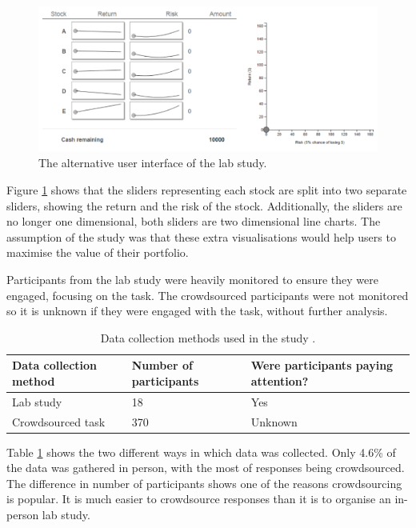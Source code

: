 \documentclass{article}
\begin{document}
\begin{figure}[ht]
    \centering
    \includegraphics[scale=0.45, frame]{Images/interfaceSA.png}
    \caption{The alternative user interface of the lab study.}
    \label{fig:interfaceSA}
\end{figure}

Figure \ref{fig:interfaceSA} shows that the sliders representing each stock are split into two separate sliders, showing the return and the risk of the stock.
Additionally, the sliders are no longer one dimensional, both sliders are two dimensional line charts.
The assumption of the study was that these extra visualisations would help users to maximise the value of their portfolio.

Participants from the lab study were heavily monitored to ensure they were engaged, focusing on the task.
The crowdsourced participants were not monitored so it is unknown if they were engaged with the task, without further analysis.

\begin{table}[ht]
    \caption{\label{table:studies} Data collection methods used in the study \cite{gruber2017thesis}.}
    \small
    \begin{tabular}{lll}
        \hline
        Data collection method & Number of participants & Were participants paying attention? \\    \hline
        Lab study              & 18                     & Yes                                 \\
        Crowdsourced task      & 370                    & Unknown                             \\    \hline
    \end{tabular}
\end{table}

Table \ref{table:studies} shows the two different ways in which data was collected.
Only 4.6\% of the data was gathered in person, with the most of responses being crowdsourced.
The difference in number of participants shows one of the reasons crowdsourcing is popular. 
It is much easier to crowdsource responses than it is to organise an in-person lab study.
\end{document}
